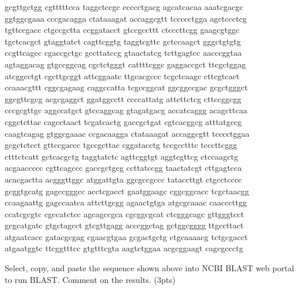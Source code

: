 \documentclass{article}
\begin{document}
gcgttgctgg cgtttttcca taggctccgc ccccctgacg agcatcacaa aaatcgacgc\\
ggtggcgaaa cccgacagga ctataaagat accaggcgtt tccccctgga agctccctcg\\
tgttccgacc ctgccgctta ccggatacct gtccgccttt ctcccttcgg gaagcgtggc\\
tgctcacgct gtaggtatct cagttcggtg taggtcgttc gctccaagct gggctgtgtg\\
ccgttcagcc cgaccgctgc gccttatccg gtaactatcg tcttgagtcc aacccggtaa\\
agtaggacag gtgccggcag cgctctgggt cattttcggc gaggaccgct ttcgctggag\\
atcggcctgt cgcttgcggt attcggaatc ttgcacgccc tcgctcaagc cttcgtcact\\
ccaaacgttt cggcgagaag caggccatta tcgccggcat ggcggccgac gcgctgggct\\
ggcgttcgcg acgcgaggct ggatggcctt ccccattatg attcttctcg cttccggcgg\\
cccgcgttgc aggccatgct gtccaggcag gtagatgacg accatcaggg acagcttcaa\\
cggctcttac cagcctaact tcgatcactg gaccgctgat cgtcacggcg atttatgccg\\
caagtcagag gtggcgaaac ccgacaagga ctataaagat accaggcgtt tcccctggaa\\
gcgctctcct gttccgaccc tgccgcttac cggatacctg tccgcctttc tcccttcggg\\
ctttctcatt gctcacgctg taggtatctc agttcggtgt aggtcgttcg ctccaagctg\\
acgaaccccc cgttcagccc gaccgctgcg ccttatccgg taactatcgt cttgagtcca\\
acacgactta acgggttggc atggattgta ggcgccgccc tataccttgt ctgcctcccc\\
gcggtgcatg gagccgggcc acctcgacct gaatggaagc cggcggcacc tcgctaacgg\\
ccaagaattg gagccaatca attcttgcgg agaactgtga atgcgcaaac caacccttgg\\
ccatcgcgtc cgccatctcc agcagccgca cgcggcgcat ctcgggcagc gttgggtcct\\
gcgcatgatc gtgctagcct gtcgttgagg acccggctag gctggcgggg ttgccttact\\
atgaatcacc gatacgcgag cgaacgtgaa gcgactgctg ctgcaaaacg tctgcgacct\\
atgaatggtc ttcggtttcc gtgtttcgta aagtctggaa acgcggaagt cagcgccctg

Select, copy, and paste the sequence shown above into NCBI BLAST web portal to run BLAST. Comment on the results. (3pts)
\end{document}
